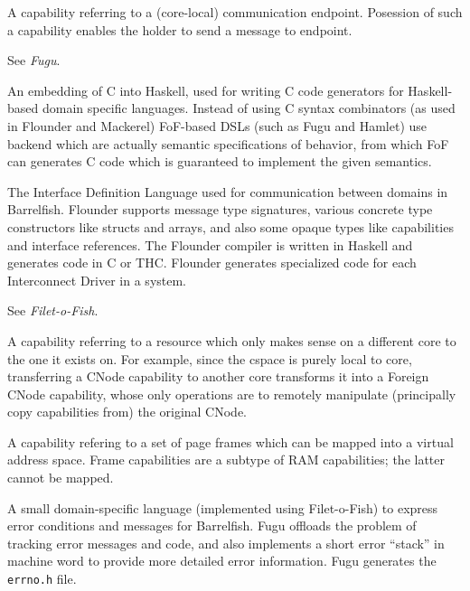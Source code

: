 \item[endpoint capability:] A capability referring to a (core-local) communication endpoint.  Posession of such a capability enables the holder to send a message to endpoint.

\item[errno.h:] See \textit{Fugu}.

\item[Filet-o-Fish \textrm{\textit{(FoF)}}:] An embedding of C into Haskell, used for writing C code generators for Haskell-based domain specific languages.  Instead of using C syntax combinators (as used in Flounder and Mackerel) FoF-based DSLs (such as Fugu and Hamlet) use backend which are actually semantic specifications of behavior, from which FoF can generates C code which is guaranteed to implement the given semantics.

\item[Flounder:] The Interface Definition Language used for communication between domains in Barrelfish.  Flounder supports message type signatures, various concrete type constructors like structs and arrays, and also some opaque types like capabilities and interface references.  The Flounder compiler is written in Haskell and generates code in C or THC.  Flounder generates specialized code for each Interconnect Driver in a system.

\item[FoF:] See \textit{Filet-o-Fish}.

\item[foreign capability:] A capability referring to a resource which only makes sense on a different core to the one it exists on.  For example, since the cspace is purely local to core, transferring a CNode capability to another core transforms it into a Foreign CNode capability, whose only operations are to remotely manipulate (principally copy capabilities from) the original CNode.

\item[frame capability:] A capability refering to a set of page frames which can be mapped into a virtual address space.  Frame capabilities are a subtype of RAM capabilities; the latter cannot be mapped.

\item[Fugu \textrm{\textit{(errno.h)}}:] A small domain-specific language (implemented using Filet-o-Fish) to express error conditions and messages for Barrelfish.  Fugu offloads the problem of tracking error messages and code, and also implements a short error ``stack'' in machine word to provide more detailed error information.  Fugu generates the \texttt{errno.h} file.


